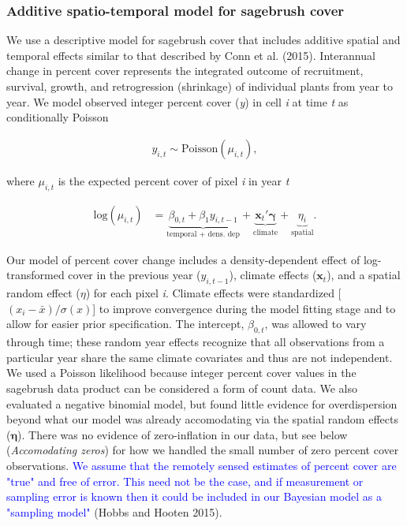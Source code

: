 \documentclass[12pt,]{article}
\begin{document}
\subsubsection{Additive spatio-temporal model for sagebrush
cover}\label{additive-spatio-temporal-model-for-sagebrush-cover}

We use a descriptive model for sagebrush cover that includes additive
spatial and temporal effects similar to that described by Conn et al.
(2015). Interannual change in percent cover represents the integrated
outcome of recruitment, survival, growth, and retrogression (shrinkage)
of individual plants from year to year. We model observed integer
percent cover (\emph{y}) in cell \emph{i} at time \emph{t} as
conditionally Poisson

\vspace{-4em}\begin{align}
y_{i,t} \sim \text{Poisson}(\mu_{i,t}),
\end{align}\vspace{-4em}

where \(\mu_{i,t}\) is the expected percent cover of pixel \emph{i} in
year \emph{t}

\vspace{-4em}\begin{align}
\text{log}(\mu_{i,t}) &= \underbrace{\beta_{0,t} + \beta_{1}y_{i,t-1}}_\text{temporal + dens. dep} + \underbrace{\textbf{x}_{t}'\boldsymbol{\gamma}}_\text{climate} + \underbrace{\eta_{i}}_\text{spatial}.
\end{align}\vspace{-3em}

Our model of percent cover change includes a density-dependent effect of
log-transformed cover in the previous year (\(y_{i,t-1}\)), climate
effects (\(\textbf{x}_t\)), and a spatial random effect (\(\eta\)) for
each pixel \emph{i}. Climate effects were standardized
{[}\((x_{i}-\bar{x}) / \sigma(x)\){]} to improve convergence during the
model fitting stage and to allow for easier prior specification. The
intercept, \(\beta_{0,t}\), was allowed to vary through time; these
random year effects recognize that all observations from a particular
year share the same climate covariates and thus are not independent. We
used a Poisson likelihood because integer percent cover values in the
sagebrush data product can be considered a form of count data. We also
evaluated a negative binomial model, but found little evidence for
overdispersion beyond what our model was already accomodating via the
spatial random effects (\(\boldsymbol{\eta}\)). There was no evidence of
zero-inflation in our data, but see below (\emph{Accomodating zeros})
for how we handled the small number of zero percent cover observations.
\textcolor{blue}{We assume that the remotely sensed estimates of percent cover are "true" and free of error.}
\textcolor{blue}{This need not be the case, and if measurement or sampling error is known then it could be included in our Bayesian model as a "sampling model"}
(Hobbs and Hooten 2015).
\end{document}
